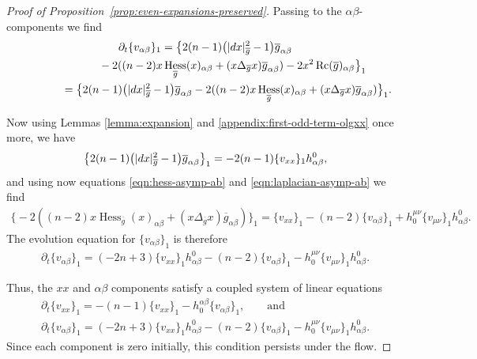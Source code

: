\documentclass[11pt]{article}
\numberwithin{equation}{section}
\newcommand{\del}{\partial}
\newcommand{\olg}{\overline{g}}
\newcommand{\gbar}{\overline{g}}
\DeclareMathOperator{\Rc}{Rc}
\DeclareMathOperator{\hess}{Hess}
\begin{document}
\begin{proof}[Proof of Proposition~\ref{prop:even-expansions-preserved}]
Passing to the $\alpha \beta$-components we find
\begin{gather*}
\del_t \{ v_{\alpha \beta} \}_{1} =\big\{ 2 (n-1) \big(|{\rm d}x|^2_{\gbar} -1\big) \olg_{{\alpha \beta}} \\
\hphantom{\del_t \{ v_{\alpha \beta} \}_{1} =}{} -2 ( (n-2) x \hess_{\olg} (x)_{{\alpha \beta}} + (x \Delta_{\olg} x) \olg_{{\alpha \beta}} ) -2 x^2 \Rc(\gbar)_{{\alpha \beta}}\big\}_1 \nonumber \\
\hphantom{\del_t \{ v_{\alpha \beta} \}_{1}}{} =\big\{ 2 (n-1)\big(|{\rm d}x|^2_{\gbar} -1\big)\olg_{{\alpha \beta}} -2 ( (n-2) x \hess_{\olg} (x)_{{\alpha \beta}} + (x \Delta_{\olg} x) \olg_{{\alpha \beta}} )\big\}_1.
\end{gather*}

Now using Lemmas \ref{lemma:expansion} and \ref{appendix:first-odd-term-olgxx} once more, we have
\begin{gather*}
\big\{ 2 (n-1) \big(|{\rm d}x|^2_{\gbar} -1\big) \olg_{{\alpha \beta}} \big\}_1 = -2(n-1)\{v_{xx}\}_1 h^0_{\alpha \beta},
\end{gather*}
and using now equations \eqref{eqn:hess-asymp-ab} and \eqref{eqn:laplacian-asymp-ab} we find
\begin{gather*}
\big\{{-}2 ((n-2) x \hess_{\olg} (x)_{{\alpha \beta}} + (x \Delta_{\olg} x) \olg_{{\alpha \beta}} ) \big\}_1 = \{v_{xx}\}_1 - (n-2) \{v_{\alpha \beta}\}_1 + h_0^{\mu \nu} \{v_{\mu\nu}\}_1 h^0_{\alpha \beta}.
\end{gather*}
The evolution equation for $\{v_{\alpha \beta}\}_1$ is therefore
\begin{gather*}
\del_t \{v_{\alpha \beta}\}_1 = (-2n+3)\{v_{xx}\}_1 h^0_{\alpha \beta} - (n-2) \{v_{\alpha \beta}\}_1 - h_0^{\mu \nu} \{v_{\mu\nu}\}_1 h^0_{\alpha \beta}.
\end{gather*}

Thus, the $xx$ and $\alpha\beta$ components satisfy a coupled system of linear equations
\begin{gather*}
\del_t \{ v_{xx} \}_{1} = -(n-1) \{v_{xx}\}_1 - h_0^{\alpha \beta} \{v_{\alpha \beta}\}_{1}, \qquad \mbox{and}\\
\del_t \{v_{\alpha \beta}\}_1 = (-2n+3)\{v_{xx}\}_1 h^0_{\alpha \beta} - (n-2) \{v_{\alpha \beta}\}_1 - h_0^{\mu \nu} \{v_{\mu\nu}\}_1 h^0_{\alpha \beta}.
\end{gather*}
Since each component is zero initially, this condition persists under the flow.


\end{proof}
\end{document}

